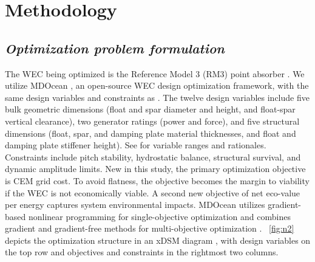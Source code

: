\documentclass[10pt,twoside]{article}
\begin{document}
\section{Methodology}
\subsection{\textit{Optimization problem formulation}}
The WEC being optimized is the Reference Model 3 (RM3) point absorber \cite{neary_reference_2014}.
We utilize MDOcean \cite{mccabe_mdocean_2024}, an open-source WEC design optimization framework, with the same design variables and constraints as \cite{mccabe_leveraging_2025}.
The twelve design variables include five bulk geometric dimensions (float and spar diameter and height, and float-spar vertical clearance), two generator ratings (power and force), and five structural dimensions (float, spar, and damping plate material thicknesses, and float and damping plate stiffener height).
See \cite{mccabe_leveraging_2025} for variable ranges and rationales.
Constraints include pitch stability, hydrostatic balance, structural survival, and dynamic amplitude limits.
New in this study, the primary optimization objective is CEM grid cost.
To avoid flatness, the objective becomes the margin to viability if the WEC is not economically viable.
A second new objective of net eco-value per energy captures system environmental impacts.
MDOcean utilizes gradient-based nonlinear programming for single-objective optimization and combines gradient and gradient-free methods for multi-objective optimization \cite{mccabe_leveraging_2025}.
\figureautorefname~\ref{fig:n2} depicts the optimization structure in an xDSM diagram \cite{lambe_extensions_2012}, with design variables on the top row and objectives and constraints in the rightmost two columns.
\end{document}

